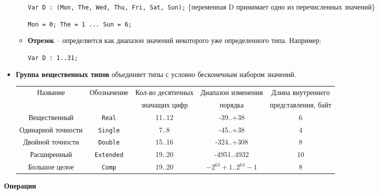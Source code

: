 \begin{itemize}
\begin{itemize}
    \texttt{Var D : (Mon, The, Wed, Thu, Fri, Sat, Sun);}  \{переменная D принимает одно из перечисленных значений\}

    \texttt{Mon = 0; The = 1 ... Sun = 6;}


    \item {\bf{Отрезок}}
        – определяется как диапазон значений некоторого уже определенного типа. Например: 

    \texttt{Var D : 1..31;}

    \end{itemize} 

    \item {\bf {Группа вещественных типов}} объединяет типы с условно бесконечным набором значений.
    {\small
    \begin{center}
        \begin{tabular}{ | c | c | c | c | c | }
        \hline
    Название & Обозначение & Кол-во десятичных  & Диапазон изменения  & Длина внутреннего \\
    &&значащих цифр&порядка&представления, байт\\
        \hline
        Вещественный & \texttt{Real} & 11..12 & -39..+38 & 6\\
        \hline
        Одинарной точности & \texttt{Single} & 7..8 & -45..+38 & 4\\
        \hline
        Двойной точности & \texttt{Double} & 15..16 & -324..+308 & 8\\
        \hline
        Расширенный & \texttt{Extended} & 19..20 & -4951..4932 & 10\\
        \hline
        Большое целое & \texttt{Comp} & 19..20 & $-2^{63}+1.. 2^{63}-1$ & 8 \\
        \hline
        \end{tabular}
    \end{center}
    }
\end{itemize}
\vspace*{10pt}
\noindent
{\bf{Операции}}
